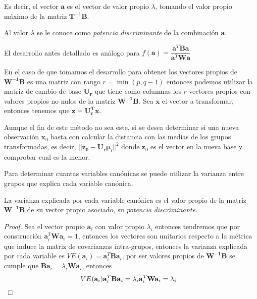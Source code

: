 \noindent Es decir, el vector $\textbf{a}$ es el vector de valor propio $\lambda$, tomando el valor propio máximo de la matriz $\textbf{T}^{-1}\textbf{B}$.

\begin{defi}
Al valor $\lambda$ se le conoce como \textit{potencia discriminante} de la combinación \textbf{a}.
\end{defi}

\begin{propo}
El desarrollo antes detallado es análogo para $f(\textbf{a})=\dfrac{\textbf{a}^T \textbf{B}\textbf{a}}{\textbf{a}^T \textbf{W}\textbf{a}}$ \cite{Johnson 2007}
\end{propo}

\noindent En el caso de que tomamos el desarrollo para obtener los vectores propios de $\mathbf{W^{-1}B}$ es una matriz con rango $r=\min(p,q-1)$ entonces podemos utilizar la matriz de cambio de base $\mathbf{U_r}$ que tiene como columnas los $r$ vectores propios con valores propios no nulos de la matriz $\mathbf{W^{-1}B}$. Sea $\mathbf{x}$ el vector a transformar, entonces  tenemos que $\mathbf{z=U_r^T x}$.

\noindent Aunque el fin de este método no sea este, si se desea determinar si una nueva observación $\mathbf{x}_0$ basta con calcular la distancia con las medias de los grupos transformadas, es decir, $||\mathbf{z_0-U_r\mu_i}||^2$ donde $\mathbf{z}_0$ es el vector en la nueva base y comprobar cual es la menor. 

\noindent Para determinar cuantas variables canónicas se puede utilizar la varianza entre grupos que explica cada variable canónica. 

\begin{propo}
La varianza explicada por cada variable canónica es el valor propio de la matriz $\mathbf{W^{-1} B}$ de su vector propio asociado, su \emph{potencia discriminante}. 
\begin{proof}
Sea el vector propio $\textbf{a}_i$ con valor propio $\lambda_i$ entonces tendremos que por construcción $\mathbf{a}_i^T \mathbf{W a}_i=1$, entonces los vectores son unitarios respecto a la métrica que induce la matriz de covarianzas intra-grupos, entonces la varianza explicada por cada variable es $VE(\textbf{a}_i)=\mathbf{a}_i^T\mathbf{Ba}_i$, por ser valores propios de $\mathbf{W^{-1}B}$ se cumple que $\mathbf{Ba}_i=\lambda_i \mathbf{W a}_i$, entonces
\begin{equation}
VE(\textbf{a}_i)\mathbf{a}_i^T\mathbf{Ba}_i=\lambda_i \mathbf{a}_i^T\mathbf{Wa}_i=\lambda_i\qedhere
\end{equation}
\end{proof}
\end{propo}

